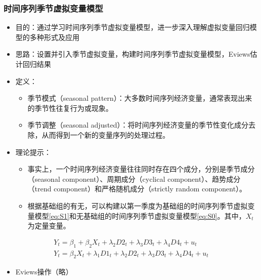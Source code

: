 \documentclass[12pt,(landscape,a4paper),(portrait,a4paper)]{article}
\providecommand{\tightlist}{%
  \setlength{\itemsep}{0pt}\setlength{\parskip}{0pt}}
\theoremstyle{definition}
\theoremstyle{definition}
\theoremstyle{definition}
\theoremstyle{remark}
\begin{document}
\hypertarget{seasonal}{%
\subsubsection{时间序列季节虚拟变量模型}\label{seasonal}}

\begin{itemize}
\tightlist
\item
  目的：通过学习时间序列季节虚拟变量模型，进一步深入理解虚拟变量回归模型的多种形式及应用\\
\item
  思路：设置并引入季节虚拟变量，构建时间序列季节虚拟变量模型，Eviews估计回归结果\\
\item
  定义：

  \begin{itemize}
  \tightlist
  \item
    季节模式（seasonal
    pattern）：大多数时间序列经济变量，通常表现出来的季节性往复行为或现象。
  \item
    季节调整（seasonal
    adjusted）：将时间序列经济变量的季节性变化成分去除，从而得到一个新的变量序列的处理过程。
  \end{itemize}
\item
  理论提示：

  \begin{itemize}
  \tightlist
  \item
    事实上，一个时间序列经济变量往往同时存在四个成分，分别是季节成分（seasonal
    component）、周期成分（cyclical component）、趋势成分（trend
    component）和严格随机成分（strictly random component）。
  \item
    根据基础组的有无，可以构建以第一季度为基础组的时间序列季节虚拟变量模型\eqref{eq:S1}和无基础组的时间序列季节虚拟变量模型\eqref{eq:S0}。其中，\(X_t\)为定量变量。
  \end{itemize}
\end{itemize}

\begin{align}
Y_t=\beta_1+\beta_2X_t+\lambda_2D2_t+\lambda_3D3_t+\lambda_4D4_t+u_t \label{eq:S1}\\
Y_t=\beta_2X_t+\lambda_1D1_t+\lambda_2D2_t+\lambda_3D3_t+\lambda_4D4_t+u_t \label{eq:S0}
\end{align}

\begin{itemize}
\tightlist
\item
  Eviews操作（略）
\end{itemize}
\end{document}

